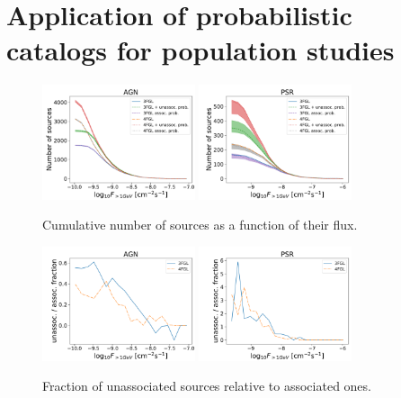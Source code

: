 \section{Application of probabilistic catalogs for population studies}



\begin{figure}[h]
\includegraphics[width=0.4\textwidth]{plots/logN_logS_AGN_unweighted.pdf}
\includegraphics[width=0.4\textwidth]{plots/logN_logS_PSR_unweighted.pdf}
\caption{Cumulative number of sources as a function of their flux.}  
\label{fig:logN_logS}
\end{figure}




\begin{figure}[h]
\includegraphics[width=0.4\textwidth]{plots/logN_logS_diff_AGN_unweighted.pdf}
\includegraphics[width=0.4\textwidth]{plots/logN_logS_diff_PSR_unweighted.pdf}
\caption{Fraction of unassociated sources relative to associated ones.}  
\label{fig:unass_vs_ass_frac}
\end{figure}



